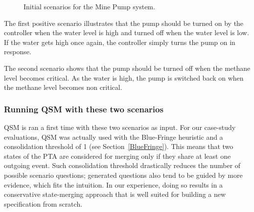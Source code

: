\begin{figure}
\centering
{}
\caption{Initial scenarios for the Mine Pump system\label{image:minepump-initial-scenarios}.}
\end{figure}

The first positive scenario illustrates that the pump should be turned on by the controller when the water level is high and turned off when the water level is low. If the water gets high once again, the controller simply turns the pump on in response. 

The second scenario shows that the pump should be turned off when the methane level becomes critical. As the water is high, the pump is switched back on when the methane level becomes non critical.

\subsubsection*{Running QSM with these two scenarios}

QSM is ran a first time with these two scenarios as input. For our case-study evaluations, QSM was actually used with the Blue-Fringe heuristic and a consolidation threshold of 1 (see Section~\ref{BlueFringe}). This means that two states of the PTA are considered for merging only if they share at least one outgoing event. Such consolidation threshold drastically reduces the number of possible scenario questions; generated questions also tend to be guided by more evidence, which fits the intuition. In our experience, doing so results in a conservative state-merging approach that is well suited for building a new specification from scratch.

